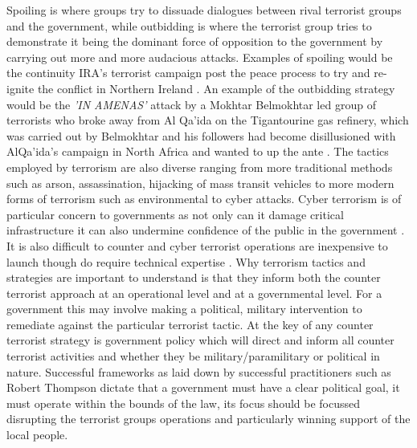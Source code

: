 Spoiling is where groups try to dissuade dialogues between rival terrorist groups and the government, while outbidding is where the terrorist group tries to demonstrate it being the dominant force of opposition to the government by carrying out more and more audacious attacks. Examples of spoiling would be the continuity IRA's terrorist campaign post the peace process to try and re-ignite the conflict in Northern Ireland \citep{whiting2015spoiling}. An example of the outbidding strategy would be the \textit{'IN AMENAS'} attack by a Mokhtar Belmokhtar led group of terrorists who broke away from Al Qa'ida on the Tigantourine gas refinery, which was carried out by Belmokhtar and his followers had become disillusioned with AlQa'ida's campaign in North Africa and wanted to up the ante \citep{watling2015ctc}. 
The tactics employed by terrorism are also diverse ranging from more traditional methods such as arson, assassination, hijacking of mass transit vehicles to more modern forms of terrorism such as environmental to cyber attacks. Cyber terrorism is of particular concern to governments as not only can it damage critical infrastructure it can also undermine confidence of the public in the government \citep{gross2016cyber}. It is also difficult to counter and cyber terrorist operations are inexpensive to launch though do require technical expertise \citep{blakemore2016policing}.
Why terrorism tactics and strategies are important to understand is that they inform both the counter terrorist approach at an operational level and at a governmental level.  For a government this may involve making a political, military intervention to remediate against the particular terrorist tactic. 
At the key of any counter terrorist strategy is government policy which will direct and inform all counter terrorist activities and whether they be military/paramilitary or political in nature. Successful frameworks as laid down by successful practitioners such as Robert Thompson dictate that a government must have a clear political goal, it must operate within the bounds of the law, its focus should be focussed disrupting the terrorist groups operations and particularly winning support of the local people. 

